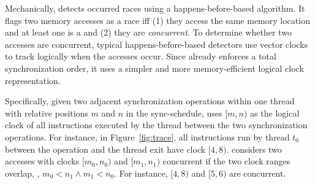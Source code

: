 

Mechanically, \peregrine detects occurred races using a happens-before-based
algorithm.  It flags two memory accesses as a race iff (1) they access the
same memory location and at least one is a  and (2) they are
\emph{concurrent}.  To determine whether two accesses are concurrent,
typical happens-before-based detectors use vector
clocks~\cite{vectorclock} to track logically when the accesses occur.
Since \peregrine already enforces a total synchronization order, it uses a
simpler and more memory-efficient logical clock representation.

Specifically, given two adjacent synchronization operations within one
thread with relative positions $m$ and $n$ in the sync-schedule, \peregrine uses $[m,n)$ as
  the logical clock of all instructions executed by the thread between the
  two synchronization operations.  For instance, in
  Figure~\ref{fig:trace}, all instructions run by thread $t_0$
  between the  operation and the thread exit have
  clock $[4, 8)$.
    \peregrine considers two accesses with clocks $[m_0, n_0)$
      and $[m_1, n_1)$ concurrent if the two clock ranges overlap, \ie,
        $m_0 < n_1 \wedge m_1 < n_0$.  For instance, $[4, 8)$ and $[5,
            6)$ are concurrent.

